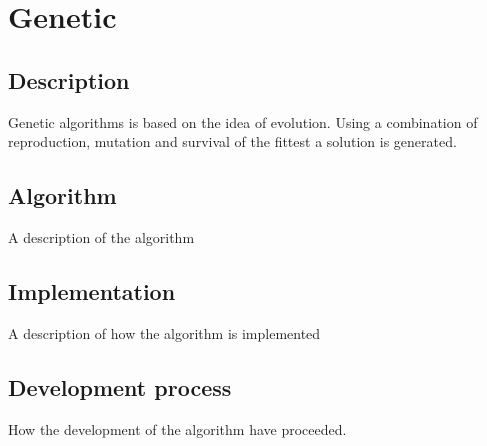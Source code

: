 \section{Genetic}
\subsection{Description}
Genetic algorithms is based on the idea of evolution. Using a combination of reproduction, mutation and survival of the fittest a solution is generated.
\subsection{Algorithm}
A description of the algorithm
\subsection{Implementation}
A description of how the algorithm is implemented
\subsection{ Development process}
How the development of the algorithm have proceeded.